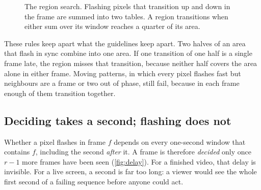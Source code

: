 \documentclass[11pt,a4paper]{article}
\begin{document}
\begin{figure}[ht]
  \centering
  \caption{The region search. Flashing pixels that transition up and down in the frame are summed into two tables. A region transitions when either sum over its window reaches a quarter of its area.}
  \label{fig:sat}
\end{figure}

These rules keep apart what the guidelines keep apart. Two halves of an area that flash in sync combine into one area. If one transition of one half is a single frame late, the region misses that transition, because neither half covers the area alone in either frame. Moving patterns, in which every pixel flashes fast but neighbours are a frame or two out of phase, still fail, because in each frame enough of them transition together.

\subsection{Deciding takes a second; flashing does not}

Whether a pixel flashes in frame $f$ depends on every one-second window that contains $f$, including the second \emph{after} it. A frame is therefore \emph{decided} only once $r-1$ more frames have been seen (\cref{fig:delay}). For a finished video, that delay is invisible. For a live screen, a second is far too long: a viewer would see the whole first second of a failing sequence before anyone could act.
\end{document}
